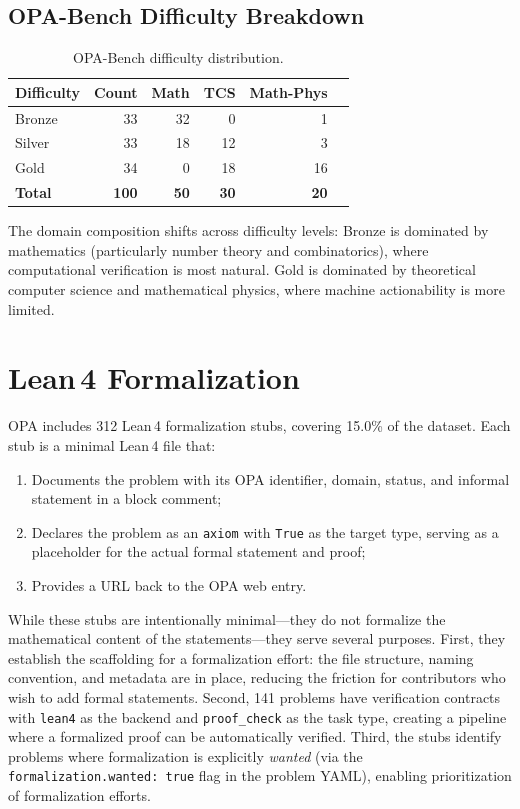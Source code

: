 \documentclass[11pt]{article}
\begin{document}
\subsection{OPA-Bench Difficulty Breakdown}

\begin{table}[H]
\centering
\caption{OPA-Bench difficulty distribution.}
\label{tab:bench-difficulty}
\begin{tabular}{@{}lrrrrr@{}}
\toprule
\textbf{Difficulty} & \textbf{Count} & \textbf{Math} & \textbf{TCS} & \textbf{Math-Phys} \\
\midrule
Bronze & 33 & 32 & 0 & 1 \\
Silver & 33 & 18 & 12 & 3 \\
Gold   & 34 & 0  & 18 & 16 \\
\midrule
\textbf{Total} & \textbf{100} & \textbf{50} & \textbf{30} & \textbf{20} \\
\bottomrule
\end{tabular}
\end{table}

The domain composition shifts across difficulty levels: Bronze is dominated by mathematics (particularly number theory and combinatorics), where computational verification is most natural.
Gold is dominated by theoretical computer science and mathematical physics, where machine actionability is more limited.

\section{Lean\,4 Formalization}
\label{sec:lean4}

OPA includes 312 Lean\,4 formalization stubs, covering 15.0\% of the dataset.
Each stub is a minimal Lean\,4 file that:
\begin{enumerate}  \item Documents the problem with its OPA identifier, domain, status, and informal statement in a block comment;
  \item Declares the problem as an \texttt{axiom} with \texttt{True} as the target type, serving as a placeholder for the actual formal statement and proof;
  \item Provides a URL back to the OPA web entry.
\end{enumerate}

While these stubs are intentionally minimal---they do not formalize the mathematical content of the statements---they serve several purposes.
First, they establish the scaffolding for a formalization effort: the file structure, naming convention, and metadata are in place, reducing the friction for contributors who wish to add formal statements.
Second, 141 problems have verification contracts with \texttt{lean4} as the backend and \texttt{proof\_check} as the task type, creating a pipeline where a formalized proof can be automatically verified.
Third, the stubs identify problems where formalization is explicitly \emph{wanted} (via the \texttt{formalization.wanted: true} flag in the problem YAML), enabling prioritization of formalization efforts.
\end{document}

